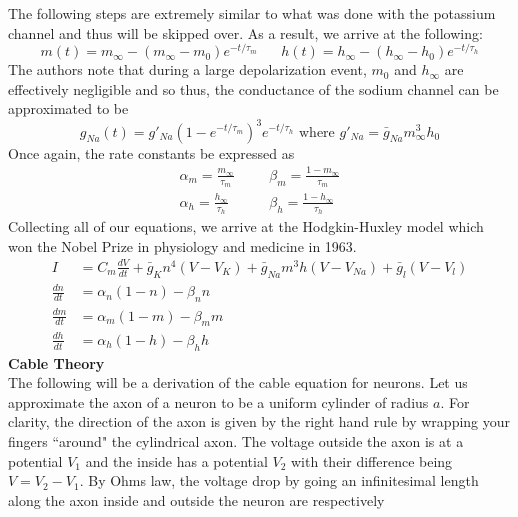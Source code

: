 \documentclass{article}
\newcommand{\od}[2]{\frac{d #1}{d #2}}
\numberwithin{equation}{section}
\begin{document}
The following steps are extremely similar to what was done with the potassium channel and thus will be skipped over. As a result, we arrive at the following:
\begin{equation}
    m(t) = m_\infty -(m_\infty-m_0)e^{-t/\tau_m} \hspace{20pt} h(t) =h_\infty - (h_\infty-h_0)e^{-t/\tau_h}
\end{equation}
The authors note that during a large depolarization event, $m_0$ and $h_\infty$ are effectively negligible and so thus, the conductance of the sodium channel can be approximated to be 
\begin{equation}
    g_{Na} (t) = g'_{Na}(1-e^{-t/\tau_m})^3e^{-t/\tau_h} \text{ where } g'_{Na} = \bar{g}_{Na} m^3_\infty h_0
\end{equation}
Once again, the rate constants be expressed as 
\begin{equation}
\begin{split}
    \alpha_m = \frac{m_\infty}{\tau_m} \hspace{20pt}& \beta_m = \frac{1-m_\infty}{\tau_m} \\
    \alpha_h = \frac{h_\infty}{\tau_h} \hspace{20pt}& \beta_h = \frac{1-h_\infty}{\tau_h}
\end{split}    
\end{equation}
Collecting all of our equations, we arrive at the Hodgkin-Huxley model which won the Nobel Prize in physiology and medicine in 1963.
\begin{equation}
    \begin{split}
        I &= C_m\od{V}{t} +\bar{g}_Kn^4(V-V_K) +\bar{g}_{Na}m^3h(V-V_{Na})+\bar{g}_l(V-V_l) \\
        \od{n}{t} & =\alpha_n(1-n) - \beta_nn \\
        \od{m}{t} & = \alpha_m (1-m)-\beta_m m\\
        \od{h}{t} & = \alpha_h(1-h)-\beta_hh \label{eq:HH}
    \end{split}
\end{equation}
\textbf{Cable Theory}\\
The following will be a derivation of the cable equation for neurons. Let us approximate the axon of a neuron to be a uniform cylinder of radius $a$. For clarity, the direction of the axon is given by the right hand rule by wrapping your fingers ``around" the cylindrical axon. The voltage outside the axon is at a potential $V_1$ and the inside has a potential $V_2$ with their difference being $V=V_2-V_1$. By Ohms law, the voltage drop by going an infinitesimal length along the axon inside and outside the neuron are respectively 
\end{document}
